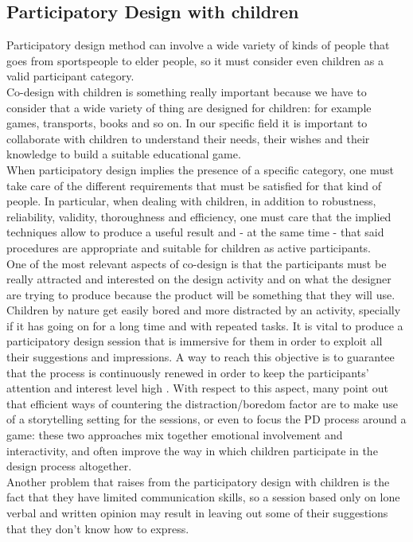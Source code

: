 \subsection{Participatory Design with children}
Participatory design method can involve a wide variety of kinds of people that goes from sportspeople to elder people, so it must consider even children as a valid participant category.\\
Co-design with children is something really important because we have to consider that a wide variety of thing are designed for children: for example games, transports, books and so on. In our specific field it is important to collaborate with children to understand their needs, their wishes and their knowledge to build a suitable educational game.\\
When participatory design implies the presence of a specific category, one must take care of the different requirements that must be satisfied for that kind of people. In particular, when dealing with children, in addition to robustness, reliability, validity, thoroughness and efficiency, one must care that the implied
techniques allow to produce a useful result and - at the same time - that said procedures are appropriate and suitable for children as active participants.\\
One of the most relevant aspects of co-design is that the participants must be really attracted and interested on the design activity and on what the designer are trying to produce because the product will be something that they will use. Children by nature get easily bored and more distracted by an activity, specially if it has going on for a long time and with repeated tasks. It is vital to produce a participatory design session that is immersive for them in order to exploit all their suggestions and impressions. A way to reach this objective is to guarantee that the process is continuously renewed in order to keep the participants' attention and interest level high \cite{PDC1}. With respect to this aspect, many point out that efficient ways of countering the distraction/boredom factor are to make use of a storytelling setting for the sessions, or even to focus the PD process around a game: these two approaches mix together emotional involvement and interactivity, and often improve the way in which children participate in the design process altogether.\\
Another problem that raises from the participatory design with children is the fact that they have limited communication skills, so a session based only on lone verbal and written opinion may result in leaving out some of their suggestions that they don't know how to express. \\
